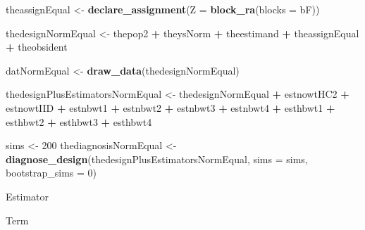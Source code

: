 \documentclass[
  12pt,
]{book}
\newenvironment{Shaded}{\begin{snugshade}}{\end{snugshade}}
\newcommand{\CommentTok}[1]{\textcolor[rgb]{0.56,0.35,0.01}{\textit{#1}}}
\newcommand{\DataTypeTok}[1]{\textcolor[rgb]{0.13,0.29,0.53}{#1}}
\newcommand{\DecValTok}[1]{\textcolor[rgb]{0.00,0.00,0.81}{#1}}
\newcommand{\KeywordTok}[1]{\textcolor[rgb]{0.13,0.29,0.53}{\textbf{#1}}}
\newcommand{\NormalTok}[1]{#1}
\newcommand{\OperatorTok}[1]{\textcolor[rgb]{0.81,0.36,0.00}{\textbf{#1}}}
\newcommand{\StringTok}[1]{\textcolor[rgb]{0.31,0.60,0.02}{#1}}
\theoremstyle{definition}
\theoremstyle{definition}
\theoremstyle{definition}
\theoremstyle{remark}
\begin{document}
\begin{Shaded}
\begin{Highlighting}[]
\NormalTok{theassignEqual <-}\StringTok{ }\KeywordTok{declare_assignment}\NormalTok{(}\DataTypeTok{Z =} \KeywordTok{block_ra}\NormalTok{(}\DataTypeTok{blocks =}\NormalTok{ bF))}

\NormalTok{thedesignNormEqual <-}\StringTok{ }\NormalTok{thepop2 }\OperatorTok{+}\StringTok{ }\NormalTok{theysNorm }\OperatorTok{+}\StringTok{ }\NormalTok{theestimand }\OperatorTok{+}\StringTok{ }\NormalTok{theassignEqual }\OperatorTok{+}\StringTok{ }\NormalTok{theobsident}

\NormalTok{datNormEqual <-}\StringTok{ }\KeywordTok{draw_data}\NormalTok{(thedesignNormEqual)}

\NormalTok{thedesignPlusEstimatorsNormEqual <-}\StringTok{ }\NormalTok{thedesignNormEqual }\OperatorTok{+}
\StringTok{  }\NormalTok{estnowtHC2 }\OperatorTok{+}\StringTok{ }\NormalTok{estnowtIID }\OperatorTok{+}\StringTok{ }\NormalTok{estnbwt1 }\OperatorTok{+}\StringTok{ }\NormalTok{estnbwt2 }\OperatorTok{+}\StringTok{ }\NormalTok{estnbwt3 }\OperatorTok{+}\StringTok{ }\NormalTok{estnbwt4 }\OperatorTok{+}
\StringTok{  }\NormalTok{esthbwt1 }\OperatorTok{+}\StringTok{ }\NormalTok{esthbwt2 }\OperatorTok{+}\StringTok{ }\NormalTok{esthbwt3 }\OperatorTok{+}\StringTok{ }\NormalTok{esthbwt4}
\end{Highlighting}
\end{Shaded}

\begin{Shaded}
\begin{Highlighting}[]
\NormalTok{sims <-}\StringTok{ }\DecValTok{200}
\NormalTok{thediagnosisNormEqual <-}\StringTok{ }\KeywordTok{diagnose_design}\NormalTok{(thedesignPlusEstimatorsNormEqual, }\DataTypeTok{sims =}\NormalTok{ sims, }\DataTypeTok{bootstrap_sims =} \DecValTok{0}\NormalTok{)}
\end{Highlighting}
\end{Shaded}

\begin{Shaded}
\end{Shaded}

Estimator

Term
\end{document}
